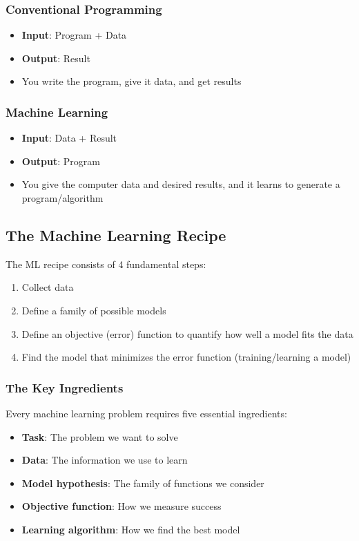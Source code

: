 \documentclass[11pt,a4paper]{article}
\theoremstyle{definition}
\theoremstyle{plain}
\theoremstyle{remark}
\begin{document}
\subsubsection{Conventional Programming}
\begin{itemize}
    \item \textbf{Input}: Program + Data
    \item \textbf{Output}: Result
    \item You write the program, give it data, and get results
\end{itemize}

\subsubsection{Machine Learning}
\begin{itemize}
    \item \textbf{Input}: Data + Result
    \item \textbf{Output}: Program
    \item You give the computer data and desired results, and it learns to generate a program/algorithm
\end{itemize}

\subsection{The Machine Learning Recipe}

The ML recipe consists of 4 fundamental steps:
\begin{enumerate}
    \item Collect data
    \item Define a family of possible models
    \item Define an objective (error) function to quantify how well a model fits the data
    \item Find the model that minimizes the error function (training/learning a model)
\end{enumerate}

\subsubsection{The Key Ingredients}

Every machine learning problem requires five essential ingredients:
\begin{itemize}
    \item \textbf{Task}: The problem we want to solve
    \item \textbf{Data}: The information we use to learn
    \item \textbf{Model hypothesis}: The family of functions we consider
    \item \textbf{Objective function}: How we measure success
    \item \textbf{Learning algorithm}: How we find the best model
\end{itemize}
\end{document}

